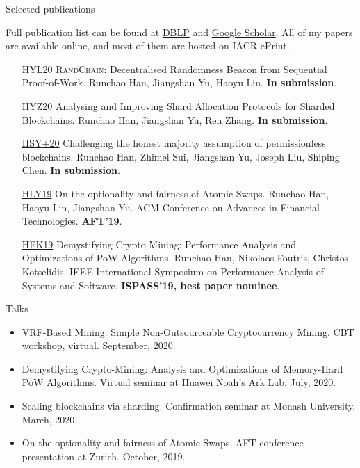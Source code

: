 \documentclass{resume} %
\begin{document}


\begin{rSection}{Selected publications} 

Full publication list can be found at \href{https://dblp.org/pers/hd/h/Han:Runchao}{DBLP} and \href{http://scholar.google.com/citations?user=xbpDocQAAAAJ&hl=en}{Google Scholar}.
All of my papers are available online, and most of them are hosted on IACR ePrint.

\begin{itemize}
    \item[\href{https://eprint.iacr.org/2020/1033}{HYL20}] \textsc{RandChain}: Decentralised Randomness Beacon from Sequential Proof-of-Work. Runchao Han, Jiangshan Yu, Haoyu Lin. \textbf{In submission}.
    \item[\href{https://eprint.iacr.org/2020/943}{HYZ20}] Analysing and Improving Shard Allocation Protocols for Sharded Blockchains. Runchao Han, Jiangshan Yu, Ren Zhang. \textbf{In submission}.
    \item[\href{https://eprint.iacr.org/2019/752}{HSY+20}] Challenging the honest majority assumption of permissionless blockchains. Runchao Han, Zhimei Sui, Jiangshan Yu, Joseph Liu, Shiping Chen.  \textbf{In submission}.
    \item[\href{https://eprint.iacr.org/2019/896}{HLY19}] On the optionality and fairness of Atomic Swaps. Runchao Han, Haoyu Lin, Jiangshan Yu.  ACM Conference on Advances in Financial Technologies. \textbf{AFT'19}.
    \item[\href{https://www.research.manchester.ac.uk/portal/files/85753741/paper.pdf}{HFK19}] Demystifying Crypto Mining: Performance Analysis and Optimizations of PoW Algorithms. Runchao Han, Nikolaos Foutris, Christos Kotselidis. IEEE International Symposium on Performance Analysis of Systems and Software. \textbf{ISPASS'19, best paper nominee}.
\end{itemize}

\end{rSection}

\begin{rSection}{Talks}
\begin{itemize}
    \item VRF-Based Mining: Simple Non-Outsourceable Cryptocurrency Mining. CBT workshop, virtual. September, 2020.
    \item Demystifying Crypto-Mining: Analysis and Optimizations of Memory-Hard PoW Algorithms. Virtual seminar at Huawei Noah's Ark Lab. July, 2020.
    \item Scaling blockchains via sharding. Confirmation seminar at Monash University. March, 2020.
    \item On the optionality and fairness of Atomic Swaps. AFT conference presentation at Zurich. October, 2019.
\end{itemize}
\end{rSection}
\end{document}

